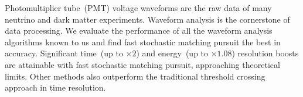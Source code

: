 Photomultiplier tube~(PMT) voltage waveforms are the raw data of many neutrino and dark matter experiments. Waveform analysis is the cornerstone of data processing. We evaluate the performance of all the waveform analysis algorithms known to us and find fast stochastic matching pursuit the best in accuracy. Significant time~(up to $\times 2$) and energy~(up to $\times 1.08$) resolution boosts are attainable with fast stochastic matching pursuit, approaching theoretical limits.  Other methods also outperform the traditional threshold crossing approach in time resolution.
